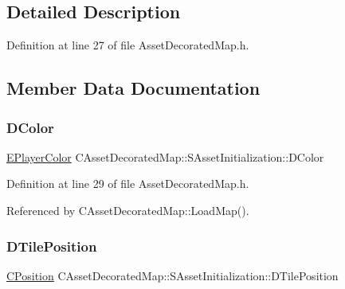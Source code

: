 \subsection{Detailed Description}


Definition at line 27 of file Asset\+Decorated\+Map.\+h.



\subsection{Member Data Documentation}
\hypertarget{structCAssetDecoratedMap_1_1SAssetInitialization_a56ad740f8d319066e5ef5781fe6c636f}{}\label{structCAssetDecoratedMap_1_1SAssetInitialization_a56ad740f8d319066e5ef5781fe6c636f} 
\subsubsection{\texorpdfstring{D\+Color}{DColor}}
{\footnotesize\ttfamily \hyperlink{GameDataTypes_8h_aafb0ca75933357ff28a6d7efbdd7602f}{E\+Player\+Color} C\+Asset\+Decorated\+Map\+::\+S\+Asset\+Initialization\+::\+D\+Color}



Definition at line 29 of file Asset\+Decorated\+Map.\+h.



Referenced by C\+Asset\+Decorated\+Map\+::\+Load\+Map().

\hypertarget{structCAssetDecoratedMap_1_1SAssetInitialization_a2579060dadc045d36f4e316096827471}{}\label{structCAssetDecoratedMap_1_1SAssetInitialization_a2579060dadc045d36f4e316096827471} 
\subsubsection{\texorpdfstring{D\+Tile\+Position}{DTilePosition}}
{\footnotesize\ttfamily \hyperlink{classCPosition}{C\+Position} C\+Asset\+Decorated\+Map\+::\+S\+Asset\+Initialization\+::\+D\+Tile\+Position}



